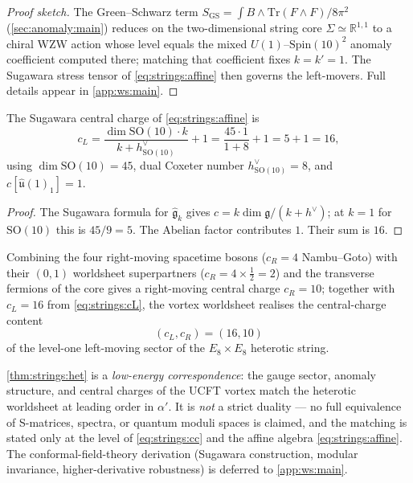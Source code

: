 \begin{proof}[Proof sketch]
The Green--Schwarz term $S_{\mathrm{GS}}=\int B\wedge
\mathrm{Tr}(F\wedge F)/8\pi^{2}$ (\autoref{sec:anomaly:main}) reduces on
the two-dimensional string core $\Sigma\simeq\mathbb{R}^{1,1}$ to a
chiral WZW action whose level equals the mixed
$U(1)$--$\mathrm{Spin}(10)^{2}$ anomaly coefficient computed there;
matching that coefficient fixes $k=k'=1$. The Sugawara stress tensor of
\eqref{eq:strings:affine} then governs the left-movers. Full details
appear in \autoref{app:ws:main}.
\end{proof}

\begin{theorem}
\label{thm:strings:cl}
The Sugawara central charge of \eqref{eq:strings:affine} is
\begin{equation}
  c_{L}
   = \frac{\dim\mathrm{SO}(10)\cdot k}{k+h^{\vee}_{\mathrm{SO}(10)}}
     + 1
   = \frac{45\cdot 1}{1+8} + 1
   = 5 + 1
   = \boxed{16},
  \label{eq:strings:cL}
\end{equation}
using $\dim\mathrm{SO}(10)=45$, dual Coxeter number
$h^{\vee}_{\mathrm{SO}(10)}=8$, and $c[\widehat{\mathfrak u}(1)_{1}]=1$.
\end{theorem}

\begin{proof}
The Sugawara formula for $\widehat{\mathfrak g}_{k}$ gives
$c=k\dim\mathfrak g/(k+h^{\vee})$; at $k=1$ for
$\mathrm{SO}(10)$ this is $45/9=5$. The Abelian factor contributes $1$.
Their sum is $16$.
\end{proof}

\begin{theorem}
\label{thm:strings:het}
Combining the four right-moving spacetime bosons ($c_{R}=4$ Nambu--Goto)
with their $(0,1)$ worldsheet superpartners ($c_{R}=4\times\tfrac12=2$)
and the transverse fermions of the core gives a right-moving central
charge $c_{R}=10$; together with $c_{L}=16$ from \eqref{eq:strings:cL},
the vortex worldsheet realises the central-charge content
\begin{equation}
  (c_{L},c_{R})=(16,10)
  \label{eq:strings:cc}
\end{equation}
of the level-one left-moving sector of the $E_{8}\times E_{8}$ heterotic
string.
\end{theorem}

\begin{remark}
\label{rem:strings:corr}
\autoref{thm:strings:het} is a \emph{low-energy correspondence}: the
gauge sector, anomaly structure, and central charges of the UCFT vortex
match the heterotic worldsheet at leading order in $\alpha'$. It is
\emph{not} a strict duality --- no full equivalence of S-matrices,
spectra, or quantum moduli spaces is claimed, and the matching is stated
only at the level of \eqref{eq:strings:cc} and the affine algebra
\eqref{eq:strings:affine}. The conformal-field-theory derivation
(Sugawara construction, modular invariance, higher-derivative
robustness) is deferred to \autoref{app:ws:main}.
\end{remark}

